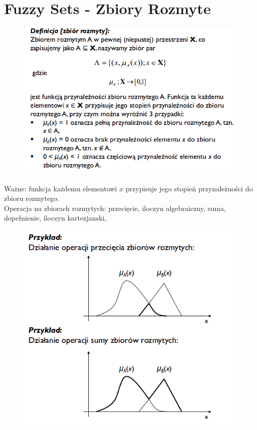 \documentclass[10pt,a4paper]{article}
\begin{document}
\section{Fuzzy Sets - Zbiory Rozmyte}
\begin{figure}[H]
  \centering
    \includegraphics[scale=0.50]{images/rozmyty.png}
\end{figure}

Ważne: funkcja każdemu elementowi $x$ przypisuje jego stopień przynależności do zbioru rozmytego. \\
Operacja na zbiorach rozmytych: przecięcie, iloczyn algebraiczny, suma, dopełnienie, iloczyn kartezjanski,
 \begin{figure}[H]
  \centering
    \includegraphics[scale=0.50]{images/dzialania.png}
\end{figure}
\end{document}

